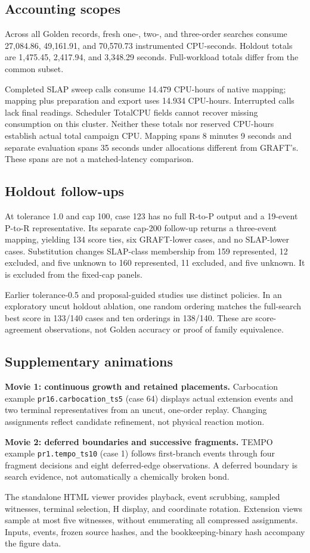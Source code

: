 \subsection{Accounting scopes}
Across all Golden records, fresh one-, two-, and three-order searches consume 27,084.86, 49,161.91, and 70,570.73 instrumented CPU-seconds. Holdout totals are 1,475.45, 2,417.94, and 3,348.29 seconds. Full-workload totals differ from the common subset.

Completed SLAP sweep calls consume 14.479 CPU-hours of native mapping; mapping plus preparation and export uses 14.934 CPU-hours. Interrupted calls lack final readings. Scheduler TotalCPU fields cannot recover missing consumption on this cluster. Neither these totals nor reserved CPU-hours establish actual total campaign CPU. Mapping spans 8 minutes 9 seconds and separate evaluation spans 35 seconds under allocations different from GRAFT's. These spans are not a matched-latency comparison.

\subsection{Holdout follow-ups}
At tolerance 1.0 and cap 100, case 123 has no full R-to-P output and a 19-event P-to-R representative. Its separate cap-200 follow-up returns a three-event mapping, yielding 134 score ties, six GRAFT-lower cases, and no SLAP-lower cases. Substitution changes SLAP-class membership from 159 represented, 12 excluded, and five unknown to 160 represented, 11 excluded, and five unknown. It is excluded from the fixed-cap panels.

Earlier tolerance-0.5 and proposal-guided studies use distinct policies. In an exploratory uncut holdout ablation, one random ordering matches the full-search best score in 133/140 cases and ten orderings in 138/140. These are score-agreement observations, not Golden accuracy or proof of family equivalence.

\subsection{Supplementary animations}
\textbf{Movie 1: continuous growth and retained placements.}
Carbocation example \texttt{pr16.carbocation\_ts5} (case 64) displays actual extension events and two terminal representatives from an uncut, one-order replay. Changing assignments reflect candidate refinement, not physical reaction motion.

\textbf{Movie 2: deferred boundaries and successive fragments.}
TEMPO example \texttt{pr1.tempo\_ts10} (case 1) follows first-branch events through four fragment decisions and eight deferred-edge observations. A deferred boundary is search evidence, not automatically a chemically broken bond.

The standalone HTML viewer provides playback, event scrubbing, sampled witnesses, terminal selection, H display, and coordinate rotation. Extension views sample at most five witnesses, without enumerating all compressed assignments. Inputs, events, frozen source hashes, and the bookkeeping-binary hash accompany the figure data.
